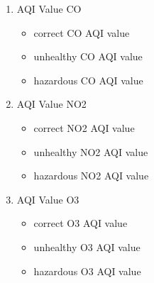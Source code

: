 \documentclass{classrep}
\begin{document}
{{\begin{enumerate}
\begin{figure}[!htbp]
                    \caption{}
                \end{figure}
                \FloatBarrier
                \item AQI Value CO
                \begin{itemize}
                    \item correct CO AQI value
                    \item unhealthy CO AQI value
                    \item hazardous CO AQI value
                \end{itemize}

                \item AQI Value NO2
                \begin{itemize}
                    \item correct NO2 AQI value
                    \item unhealthy NO2 AQI value
                    \item hazardous NO2 AQI value
                \end{itemize}

                \item AQI Value O3
                \begin{itemize}
                    \item correct O3 AQI value
                    \item unhealthy O3 AQI value
                    \item hazardous O3 AQI value
                \end{itemize}


\end{enumerate}}}
\end{document}
